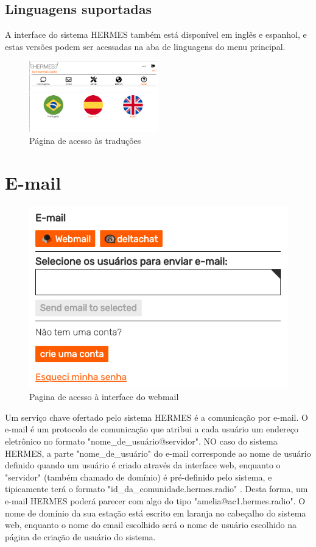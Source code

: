 \documentclass[11pt,a4paper]{article}
\begin{document}
\subsection{Linguagens suportadas}
\label{langs}

A interface do sistema HERMES também está disponível em inglês e espanhol, e estas versões podem ser acessadas na aba de linguagens do menu principal.


\begin{figure}[H]
    \centering
    \includegraphics[width=0.5\textwidth]{screenshots/frontend/pt_kn/language.png}
    \caption{Página de acesso às traduções}
	\vspace{-10pt}
    \label{fig:languages}
\end{figure}


\section{E-mail}
\label{email}

\begin{figure}[H]
    \centering
    \includegraphics[width=0.5\columnwidth]{screenshots/frontend/pt_kn/email.png}
    	\caption{Pagina de acesso à interface do webmail}
	\vspace{-10pt}
    \label{fig:webmail2}
\end{figure}

Um serviço chave ofertado pelo sistema HERMES é a comunicação por e-mail. O e-mail é um protocolo de comunicação que atribui a cada usuário um endereço eletrônico no formato "nome\_de\_usuário@servidor". NO caso do sistema HERMES, a parte "nome\_de\_usuário" do e-mail corresponde ao nome de usuário definido quando um usuário é criado através da interface web, enquanto o "servidor" (também chamado de domínio) é pré-definido pelo sistema, e tipicamente terá o formato "id\_da\_comunidade.hermes.radio" . Desta forma, um e-mail HERMES poderá parecer com algo do tipo "amelia@ac1.hermes.radio". O nome de domínio da sua estação está escrito em laranja no cabeçalho do sistema web, enquanto o nome do email escolhido será o nome de usuário escolhido na página de criação de usuário do sistema. 
\end{document}
